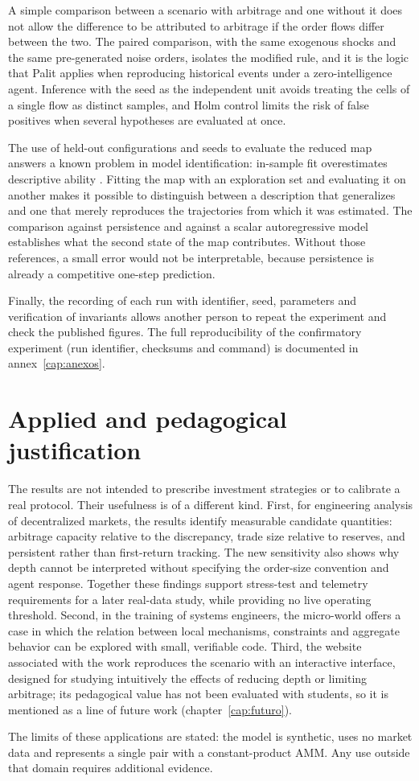 A simple comparison between a scenario with arbitrage and one without it does not allow the difference to be attributed to arbitrage if the order flows differ between the two. The paired comparison, with the same exogenous shocks and the same pre-generated noise orders, isolates the modified rule, and it is the logic that Palit \cite{palit2022shuffled} applies when reproducing historical events under a zero-intelligence agent. Inference with the seed as the independent unit avoids treating the cells of a single flow as distinct samples, and Holm control limits the risk of false positives when several hypotheses are evaluated at once.

The use of held-out configurations and seeds to evaluate the reduced map answers a known problem in model identification: in-sample fit overestimates descriptive ability \cite{lamperti2018surrogates}. Fitting the map with an exploration set and evaluating it on another makes it possible to distinguish between a description that generalizes and one that merely reproduces the trajectories from which it was estimated. The comparison against persistence and against a scalar autoregressive model establishes what the second state of the map contributes. Without those references, a small error would not be interpretable, because persistence is already a competitive one-step prediction.

Finally, the recording of each run with identifier, seed, parameters and verification of invariants \cite{grimm2020odd,railsback2019agent} allows another person to repeat the experiment and check the published figures. The full reproducibility of the confirmatory experiment (run identifier, checksums and command) is documented in annex~\ref{cap:anexos}.

\section{Applied and pedagogical justification}

The results are not intended to prescribe investment strategies or to calibrate a real protocol. Their usefulness is of a different kind. First, for engineering analysis of decentralized markets, the results identify measurable candidate quantities: arbitrage capacity relative to the discrepancy, trade size relative to reserves, and persistent rather than first-return tracking. The new sensitivity also shows why depth cannot be interpreted without specifying the order-size convention and agent response. Together these findings support stress-test and telemetry requirements for a later real-data study, while providing no live operating threshold. Second, in the training of systems engineers, the micro-world offers a case in which the relation between local mechanisms, constraints and aggregate behavior can be explored with small, verifiable code. Third, the website associated with the work reproduces the scenario with an interactive interface, designed for studying intuitively the effects of reducing depth or limiting arbitrage; its pedagogical value has not been evaluated with students, so it is mentioned as a line of future work (chapter~\ref{cap:futuro}).

The limits of these applications are stated: the model is synthetic, uses no market data and represents a single pair with a constant-product AMM. Any use outside that domain requires additional evidence.
